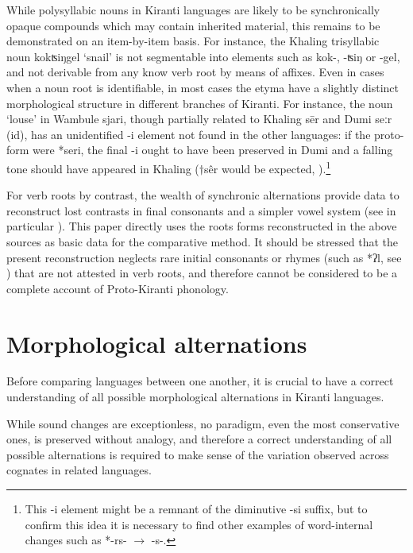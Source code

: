 \documentclass[oneside,a4paper,11pt]{article}
\newcommand{\ipa}[1]{{\phon\mbox{#1}}} %
\newcommand{\change}[2]{*\ipa{#1} $\rightarrow$ \ipa{#2}}
\begin{document}
While polysyllabic nouns in Kiranti languages are likely to be synchronically opaque compounds which may contain inherited material, this remains to be demonstrated on an item-by-item basis.  For instance, the Khaling trisyllabic noun \ipa{kokʦiŋgel} `snail' is not segmentable into elements such as \ipa{kok-}, \ipa{-ʦiŋ} or \ipa{-gel}, and not derivable from any know verb root by means of affixes. Even in cases when a noun root is identifiable, in most cases the etyma have a slightly distinct morphological structure in different branches of Kiranti. For instance, the noun `louse' in Wambule \ipa{sjari}, though partially related to Khaling \ipa{sēr} and Dumi \ipa{seːr} (id), has an unidentified \ipa{-i} element not found in the other languages: if the proto-form were *\ipa{seri}, the final \ipa{-i} ought to have been preserved in Dumi and a falling tone should have appeared in Khaling ($\dagger$\ipa{sêr} would be expected, \citealt{jacques16tonogenesis}).\footnote{This \ipa{-i} element might be a remnant of the diminutive \ipa{-si} suffix, but to confirm this idea it is necessary to find other examples of word-internal changes such as \change{-rs-}{-s-}. }

For verb roots by contrast, the wealth of synchronic alternations provide data to reconstruct lost contrasts in final consonants and a simpler vowel system (see in particular \citealt{michailovsky02dico, jacques12khaling, michailovsky12dumi}). This paper directly uses the roots forms reconstructed in the above sources as basic data for the comparative method. It should be stressed that the present reconstruction neglects rare initial consonants or rhymes (such as *\ipa{ʔl}, see \citealt{opgenort04implosives}) that are not attested in verb roots, and therefore cannot be considered to be a complete account of Proto-Kiranti phonology.


\section{Morphological alternations} \label{sec:alternations}
Before comparing languages between one another, it is crucial to have a correct understanding of all possible morphological alternations in Kiranti languages. 

While sound changes are exceptionless, no paradigm, even the most conservative ones, is preserved without analogy, and therefore a correct understanding of all possible alternations is required to make sense of the variation observed across cognates in related languages.
\end{document}
